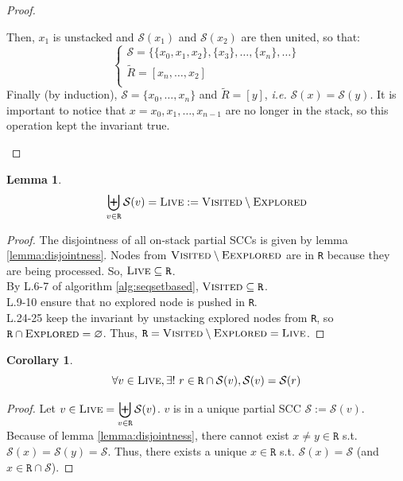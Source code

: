 \documentclass[a4 paper, 12pt]{article}
\theoremstyle{definition}
\newtheorem{lemma}{Lemma}
\newtheorem{corollary}{Corollary}[lemma]
\begin{document}
\begin{proof}
\begin{itemize}
        Then, $x_1$ is unstacked and $\mathcal{S}(x_1)$ and $\mathcal{S}(x_2)$ are then united, so that:
        \begin{equation*}
            \left\{
                    \begin{array}{l}
                        \mathcal{S} = \{\{x_0, x_1, x_2\}, \{x_3\}, \ldots, \{x_n\}, \ldots\}\\
                        \widetilde{R} = [x_n, \ldots, x_2]\\
                    \end{array}
                \right.
        \end{equation*}
        Finally (by induction), $\mathcal{S} = \{x_0, \ldots, x_n\}$ and $\widetilde{R} = [y]$, \textit{i.e.} $\mathcal{S}(x)=\mathcal{S}(y)$. It is important to notice that $x=x_0, x_1, \ldots, x_{n-1}$ are no longer in the stack, so this operation kept the invariant true.
    \end{itemize}
\end{proof}

\begin{lemma}
    \begin{equation*}
        \biguplus_{v \in \texttt{R}} \mathcal{S}(v) = \textsc{Live} := \textsc{Visited} \setminus \textsc{Explored}
    \end{equation*}
\end{lemma}

\begin{proof}
    The disjointness of all on-stack partial SCCs is given by lemma \ref{lemma:disjointness}. Nodes from $\textsc{Visited} \setminus \textsc{Eexplored}$ are in \texttt{R} because they are being processed. So, $\textsc{Live} \subseteq \texttt{R}$.\\
    By L.6-7 of algorithm \ref{alg:seqsetbased}, $\textsc{Visited} \subseteq \texttt{R}$.\\
    L.9-10 ensure that no explored node is pushed in \texttt{R}.\\
    L.24-25 keep the invariant by unstacking explored nodes from \texttt{R}, so $\texttt{R} \cap \textsc{Explored} = \varnothing$. Thus, $\texttt{R} = \textsc{Visited} \setminus \textsc{Explored} = \textsc{Live}$.
\end{proof}

\begin{corollary}\label{cor:cor1}
    \begin{equation*}
        \forall v \in \textsc{Live}, \exists!~r \in \texttt{R} \cap \mathcal{S}(v), \mathcal{S}(v) = \mathcal{S}(r)
    \end{equation*}
\end{corollary}
\begin{proof}
    Let $v \in \textsc{Live} = \displaystyle{\biguplus_{v \in \texttt{R}} \mathcal{S}(v)}$. $v$ is in a unique partial SCC $\mathscr{S} := \mathcal{S}(v)$. Because of lemma \ref{lemma:disjointness}, there cannot exist $x \neq y \in \texttt{R}$ s.t. $\mathcal{S}(x) = \mathcal{S}(y) = \mathscr{S}$. Thus, there exists a unique $x \in \texttt{R}$ s.t. $\mathcal{S}(x) = \mathscr{S}$ (and $x\in \texttt{R} \cap \mathscr{S}$).
\end{proof}
\end{document}
